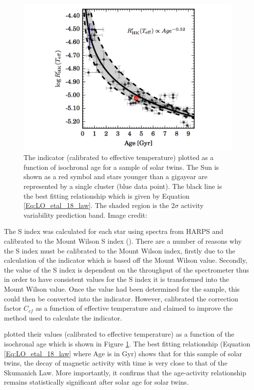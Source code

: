 \begin{figure}
    \centering
    \includegraphics[scale=0.45]{Figures/2-Historical_overview/LO_etal_18_age_activity_plot.pdf}
    \caption{The \Rprime indicator (calibrated to effective temperature) plotted as a function of isochronal age for a sample of solar twins. The Sun is shown as a red symbol and stars younger than a gigayear are represented by a single cluster (blue data point). The black line is the best fitting relationship which is given by Equation \ref{Eq:LO_etal_18_law}. The shaded region is the 2$\sigma$ activity variability prediction band. Image credit: \citet{Lorenzo_Oliveira_etal_2018}}
    \label{fig:LO_etal_18_plot}
\end{figure}

The S index was calculated for each star using spectra from HARPS and calibrated to the Mount Wilson S index (\Smw). There are a number of reasons why the S index must be calibrated to the Mount Wilson index, firstly due to the calculation of the \Rprime indicator which is based off the Mount Wilson value. Secondly, the value of the S index is dependent on the throughput of the spectrometer thus in order to have consistent values for the S index it is transformed into the Mount Wilson value. Once the \Smw value had been determined for the sample, this could then be converted into the \Rprime indicator. However, \citet{Lorenzo_Oliveira_etal_2018} calibrated the correction factor $C_{cf}$ as a function of effective temperature and claimed to improve the method used to calculate the \Rprime indicator.

\citet{Lorenzo_Oliveira_etal_2018} plotted their \Rprime values (calibrated to effective temperature) as a function of the isochronal age which is shown in Figure \ref{fig:LO_etal_18_plot}. The best fitting relationship (Equation \ref{Eq:LO_etal_18_law} where Age is in Gyr) shows that for this sample of solar twins, the decay of magnetic activity with time is very close to that of the Skumanich Law. More importantly, it confirms that the age-activity relationship remains statistically significant after solar age for solar twins.

